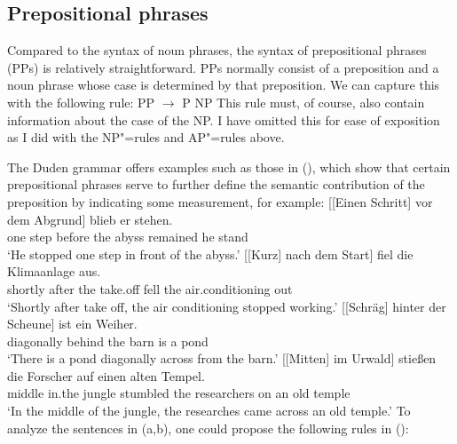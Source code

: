 \subsection{Prepositional phrases}
\label{Abschnitt-PP-Syntax}

Compared to the syntax of noun phrases, the syntax of prepositional phrases (PPs) is relatively straightforward. PPs normally 
consist of a preposition and a noun phrase whose case is determined by that preposition. We can capture this with the following
rule:
\ea
\label{Regel-PP-einfach}
PP $\to$ P NP
\z
This rule must, of course, also contain information about the case of the NP. I have omitted this for ease of exposition as I did
with the NP"=rules and AP"=rules above.

The Duden grammar \citep[\S 1300]{Duden2005-Authors} offers examples such as those in (), which show that certain prepositional phrases
serve to further define the semantic contribution of the preposition by indicating some measurement, for example:
\eal
\ex\label{Beispiel-Schritt-vor-dem-Abgrund} 
\gll {}[[Einen Schritt] vor dem Abgrund] blieb er stehen.\\
	 {}\spacebr{}\spacebr{}one step before the abyss remained he stand\\
\glt `He stopped one step in front of the abyss.'
\ex 
\gll {}[[Kurz] nach dem Start] fiel die Klimaanlage aus.\\
	 {}\spacebr{}\spacebr{}shortly after the take.off fell the air.conditioning out\\
\glt `Shortly after take off, the air conditioning stopped working.'
\ex 
\gll {}[[Schräg] hinter der Scheune] ist ein Weiher.\\
	 {}\spacebr{}\spacebr{}diagonally behind the barn is a pond\\
\glt `There is a pond diagonally across from the barn.'
\ex 
\gll {}[[Mitten] im Urwald] stießen die Forscher auf einen alten Tempel.\\
	 {}\spacebr{}\spacebr{}middle in.the jungle stumbled the researchers on an old temple\\
\glt `In the middle of the jungle, the researches came across an old temple.'
\zl
To analyze the sentences in (a,b), one could propose the following rules in ():

